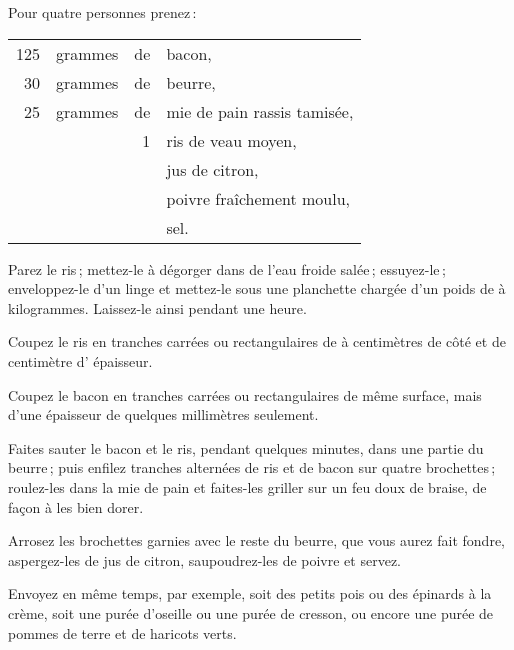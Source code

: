 Pour quatre personnes prenez :

\medskip

\footnotesize
\begin{longtable}{rrrp{18em}}
    125 & grammes & de & bacon,                                                                           \\
     30 & grammes & de & beurre,                                                                          \\
     25 & grammes & de & mie de pain rassis tamisée,                                                      \\
        &         &  1 & ris de veau moyen,                                                               \\
        &         &    & jus de citron,                                                                   \\
        &         &    & poivre fraîchement moulu,                                                        \\
        &         &    & sel.                                                                             \\
\end{longtable}
\normalsize

Parez le ris ; mettez-le à dégorger dans de l’eau froide salée ; essuyez-le ;
enveloppez-le d'un linge et mettez-le sous une planchette chargée d'un poids de
{\mmm} à {\mmm} kilogrammes. Laissez-le ainsi pendant une heure.

Coupez le ris en tranches carrées ou rectangulaires de {\mmm}
à {\mmm} centimètres de côté et de {\mmm} centimètre d' épaisseur.

Coupez le bacon en tranches carrées ou rectangulaires de même surface, mais
d'une épaisseur de quelques millimètres seulement.

Faites sauter le bacon et le ris, pendant quelques minutes, dans une partie du
beurre ; puis enfilez tranches alternées de ris et de bacon sur quatre
brochettes ; roulez-les dans la mie de pain et faites-les griller sur un feu
doux de braise, de façon à les bien dorer.

Arrosez les brochettes garnies avec le reste du beurre, que vous aurez fait
fondre, aspergez-les de jus de citron, saupoudrez-les de poivre et servez.

Envoyez en même temps, par exemple, soit des petits pois ou des épinards à la
crème, soit une purée d’oseille ou une purée de cresson, ou encore une purée de
pommes de terre et de haricots verts.

